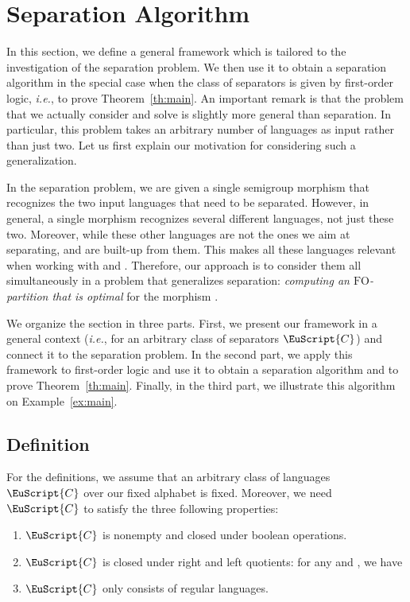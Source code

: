 \documentclass{CSML}
\newcommand\Cs{\ensuremath{\EuScript{C}}\xspace}
\newcommand{\fo}{\ensuremath{\text{FO}}\xspace}
\theoremstyle{plain}
\begin{document}
\section{Separation Algorithm}
\label{sec:main}
In this section, we define a general framework which is tailored
to the investigation of the separation problem. We then use it to
obtain a separation algorithm in the special case when the class
of separators is given by first-order logic, \emph{i.e.}, to prove
Theorem~\ref{th:main}. An important remark is that the problem that
we actually consider and solve is slightly more general than
separation. In particular, this problem takes an arbitrary number of
languages as input rather than just two. Let us first explain our
motivation for considering such a generalization.

In the separation problem, we are given a single semigroup morphism
 that recognizes the two input languages  that need
to be separated. However, in general, a single morphism recognizes
several different languages, not just these two. Moreover, while these
other languages are not the ones we aim at separating,  and 
are built-up from them. This makes all these languages relevant when
working with  and . Therefore, our approach is to consider
them all simultaneously in a problem that generalizes separation:
\emph{computing an \fo-partition that is optimal} for the morphism
.

\medskip
We organize the section in three parts. First, we present our
framework in a general context (\emph{i.e.}, for an arbitrary class
of
separators \Cs) and connect it to the separation problem. In the
second part, we apply this framework to first-order logic and use
it to obtain a separation algorithm and to prove Theorem~\ref{th:main}.
Finally, in the third part, we illustrate this algorithm on
Example~\ref{ex:main}.

\subsection{Definition}

For the definitions, we assume that an arbitrary class of languages
\Cs over our fixed alphabet  is fixed. Moreover, we need \Cs to satisfy the three following
properties:
\begin{enumerate}
\item \Cs is nonempty and closed under boolean operations.
\item \Cs is closed under right and left quotients: for any  and , we have
  
\item \Cs only consists of regular languages.
\end{enumerate}
\end{document}
